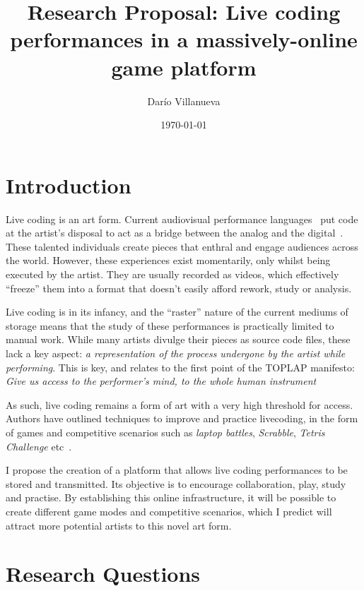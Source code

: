 \documentclass[12pt]{article}
\title{Research Proposal: Live coding performances in a massively-online game platform}
\date{\today}
\author{Darío Villanueva}
\begin{document}
\maketitle

\section*{Introduction}

Live coding is an art form. Current audiovisual performance languages~\cite{gibber, tidal,supercollider,livecodelab} put code at the artist's disposal to act as a bridge between the analog and the digital~\cite{textural-x}. These talented individuals create pieces that enthral and engage audiences across the world. However, these experiences exist momentarily, only whilst being executed by the artist. They are usually recorded as videos, which effectively ``freeze'' them into a format that doesn't easily afford rework, study or analysis.

Live coding is in its infancy, and the ``raster'' nature of the current mediums of storage means that the study of these performances is practically limited to manual work. While many artists divulge their pieces as source code files, these lack a key aspect: \emph{a representation of the process undergone by the artist while performing}. This is key, and relates to the first point of the TOPLAP manifesto: \emph{Give us access to the performer's mind, to the whole human instrument}~\cite{toplap-manifesto}

As such, live coding remains a form of art with a very high threshold for access. Authors have outlined techniques to improve and practice livecoding, in the form of games and competitive scenarios such as \emph{laptop battles}, \emph{Scrabble}, \emph{Tetris Challenge} etc~\cite{laptop-performance, live-coding-practice}.

I propose the creation of a platform that allows live coding performances to be stored and transmitted. Its objective is to encourage collaboration, play, study and practise. By establishing this online infrastructure, it will be possible to create different game modes and competitive scenarios, which I predict will attract more potential artists to this novel art form.


\section*{Research Questions}
\end{document}
